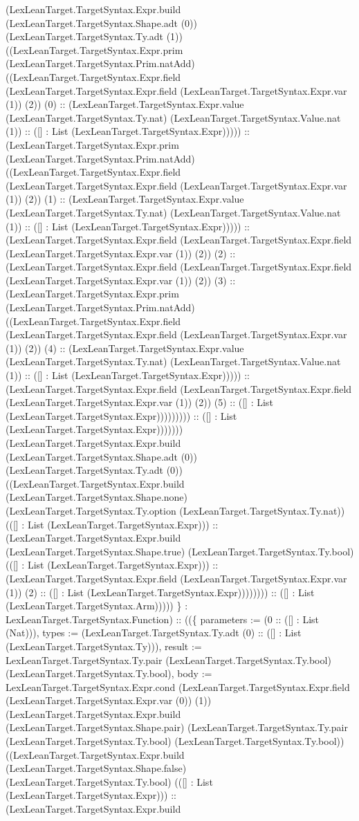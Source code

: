 \documentclass[11pt]{article}
\begin{document}
(LexLeanTarget.TargetSyntax.Expr.build (LexLeanTarget.TargetSyntax.Shape.adt (0)) (LexLeanTarget.TargetSyntax.Ty.adt (1)) ((LexLeanTarget.TargetSyntax.Expr.prim (LexLeanTarget.TargetSyntax.Prim.natAdd) ((LexLeanTarget.TargetSyntax.Expr.field (LexLeanTarget.TargetSyntax.Expr.field (LexLeanTarget.TargetSyntax.Expr.var (1)) (2)) (0) :: (LexLeanTarget.TargetSyntax.Expr.value (LexLeanTarget.TargetSyntax.Ty.nat) (LexLeanTarget.TargetSyntax.Value.nat (1)) :: ([] : List (LexLeanTarget.TargetSyntax.Expr))))) :: (LexLeanTarget.TargetSyntax.Expr.prim (LexLeanTarget.TargetSyntax.Prim.natAdd) ((LexLeanTarget.TargetSyntax.Expr.field (LexLeanTarget.TargetSyntax.Expr.field (LexLeanTarget.TargetSyntax.Expr.var (1)) (2)) (1) :: (LexLeanTarget.TargetSyntax.Expr.value (LexLeanTarget.TargetSyntax.Ty.nat) (LexLeanTarget.TargetSyntax.Value.nat (1)) :: ([] : List (LexLeanTarget.TargetSyntax.Expr))))) :: (LexLeanTarget.TargetSyntax.Expr.field (LexLeanTarget.TargetSyntax.Expr.field (LexLeanTarget.TargetSyntax.Expr.var (1)) (2)) (2) :: (LexLeanTarget.TargetSyntax.Expr.field (LexLeanTarget.TargetSyntax.Expr.field (LexLeanTarget.TargetSyntax.Expr.var (1)) (2)) (3) :: (LexLeanTarget.TargetSyntax.Expr.prim (LexLeanTarget.TargetSyntax.Prim.natAdd) ((LexLeanTarget.TargetSyntax.Expr.field (LexLeanTarget.TargetSyntax.Expr.field (LexLeanTarget.TargetSyntax.Expr.var (1)) (2)) (4) :: (LexLeanTarget.TargetSyntax.Expr.value (LexLeanTarget.TargetSyntax.Ty.nat) (LexLeanTarget.TargetSyntax.Value.nat (1)) :: ([] : List (LexLeanTarget.TargetSyntax.Expr))))) :: (LexLeanTarget.TargetSyntax.Expr.field (LexLeanTarget.TargetSyntax.Expr.field (LexLeanTarget.TargetSyntax.Expr.var (1)) (2)) (5) :: ([] : List (LexLeanTarget.TargetSyntax.Expr))))))))) :: ([] : List (LexLeanTarget.TargetSyntax.Expr))))))) (LexLeanTarget.TargetSyntax.Expr.build (LexLeanTarget.TargetSyntax.Shape.adt (0)) (LexLeanTarget.TargetSyntax.Ty.adt (0)) ((LexLeanTarget.TargetSyntax.Expr.build (LexLeanTarget.TargetSyntax.Shape.none) (LexLeanTarget.TargetSyntax.Ty.option (LexLeanTarget.TargetSyntax.Ty.nat)) (([] : List (LexLeanTarget.TargetSyntax.Expr))) :: (LexLeanTarget.TargetSyntax.Expr.build (LexLeanTarget.TargetSyntax.Shape.true) (LexLeanTarget.TargetSyntax.Ty.bool) (([] : List (LexLeanTarget.TargetSyntax.Expr))) :: (LexLeanTarget.TargetSyntax.Expr.field (LexLeanTarget.TargetSyntax.Expr.var (1)) (2) :: ([] : List (LexLeanTarget.TargetSyntax.Expr)))))))) :: ([] : List (LexLeanTarget.TargetSyntax.Arm))))) \} : LexLeanTarget.TargetSyntax.Function) :: ((\{ parameters := (0 :: ([] : List (Nat))), types := (LexLeanTarget.TargetSyntax.Ty.adt (0) :: ([] : List (LexLeanTarget.TargetSyntax.Ty))), result := LexLeanTarget.TargetSyntax.Ty.pair (LexLeanTarget.TargetSyntax.Ty.bool) (LexLeanTarget.TargetSyntax.Ty.bool), body := LexLeanTarget.TargetSyntax.Expr.cond (LexLeanTarget.TargetSyntax.Expr.field (LexLeanTarget.TargetSyntax.Expr.var (0)) (1)) (LexLeanTarget.TargetSyntax.Expr.build (LexLeanTarget.TargetSyntax.Shape.pair) (LexLeanTarget.TargetSyntax.Ty.pair (LexLeanTarget.TargetSyntax.Ty.bool) (LexLeanTarget.TargetSyntax.Ty.bool)) ((LexLeanTarget.TargetSyntax.Expr.build (LexLeanTarget.TargetSyntax.Shape.false) (LexLeanTarget.TargetSyntax.Ty.bool) (([] : List (LexLeanTarget.TargetSyntax.Expr))) :: (LexLeanTarget.TargetSyntax.Expr.build 
\end{document}
